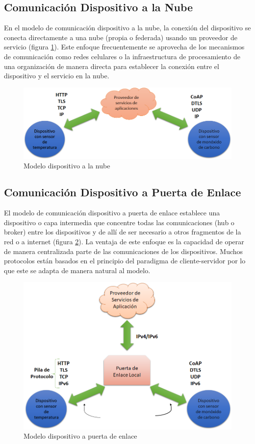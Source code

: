 \subsection{Comunicación Dispositivo a la Nube}
En el modelo de comunicación dispositivo a la nube, la conexión del dispositivo se conecta directamente a una nube (propia o federada) usando un proveedor de servicio (figura \ref{fig:d2n}). Este enfoque frecuentemente se aprovecha de los mecanismos de comunicación como redes celulares o la infraestructura de procesamiento de una  organización de manera directa para establecer la conexión entre el dispositivo y el servicio en la nube.
\begin{figure}[htb]
\centering
\includegraphics[scale=0.4]{./Figuras/d2n.png}
\caption{Modelo dispositivo a la nube}
\label{fig:d2n}
\end{figure}

\subsection{Comunicación Dispositivo a Puerta de Enlace}
El modelo de comunicación dispositivo a puerta de enlace establece una dispositivo o capa intermedia que concentre todas las comunicaciones (hub o broker) entre los dispositivos y de allí de ser necesario a otros fragmentos de la red o a internet (figura \ref{fig:d2g}). La ventaja de este enfoque es la capacidad de operar de manera centralizada parte de las comunicaciones de los dispositivos. Muchos protocolos están basados en el principio del paradigma de cliente-servidor por lo que este se adapta de manera natural al modelo.
\begin{figure}[htb]
\centering
\includegraphics[scale=0.4]{./Figuras/d2g.png}
\caption{Modelo dispositivo a puerta de enlace}
\label{fig:d2g}
\end{figure}

